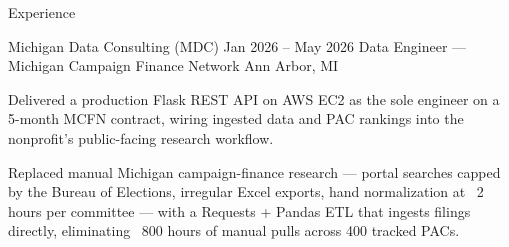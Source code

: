 \documentclass[
	11pt
]{../../../template}
\begin{document}
\begin{rSection}{E}{xperience}
		\begin{rSectionEntry}
			{Michigan Data Consulting (MDC)}
			{Jan 2026 -- May 2026}
			{Data Engineer --- Michigan Campaign Finance Network}
			{}
			{Ann Arbor, MI}

			\item Delivered a production Flask REST API on AWS EC2 as the sole engineer on a 5-month MCFN contract, wiring ingested data and PAC rankings into the nonprofit's public-facing research workflow.
			\item Replaced manual Michigan campaign-finance research --- portal searches capped by the Bureau of Elections, irregular Excel exports, hand normalization at ~2 hours per committee --- with a Requests + Pandas ETL that ingests filings directly, eliminating ~800 hours of manual pulls across 400 tracked PACs.
		\end{rSectionEntry}
	\end{rSection}
\end{document}
